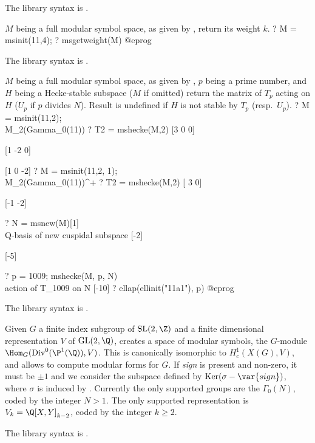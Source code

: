 The library syntax is .

\label{se:msgetweight}
$M$ being a full modular symbol space, as given by , return
its weight $k$.
\bprog
? M = msinit(11,4);
? msgetweight(M)
@eprog

The library syntax is .

\label{se:mshecke}
$M$ being a full modular symbol space, as given by ,
$p$ being a prime number, and $H$ being a Hecke-stable subspace ($M$ if
omitted) return the matrix of $T_p$ acting on $H$
($U_p$ if $p$ divides $N$). Result is undefined if $H$ is not stable
by $T_p$ (resp.~$U_p$).
\bprog
? M = msinit(11,2); \\ M_2(Gamma_0(11))
? T2 = mshecke(M,2)
[3  0  0]

[1 -2  0]

[1  0 -2]
? M = msinit(11,2, 1); \\ M_2(Gamma_0(11))^+
? T2 = mshecke(M,2)
[ 3  0]

[-1 -2]

? N = msnew(M)[1] \\ Q-basis of new cuspidal subspace
[-2]

[-5]

? p = 1009; mshecke(M, p, N) \\ action of T_1009 on N
[-10]
? ellap(ellinit("11a1"), p)
@eprog

The library syntax is .

\label{se:msinit}
Given $G$ a finite index subgroup of $\text{SL}(2,\Z)$
and a finite dimensional representation $V$ of $\text{GL}(2,\Q)$, creates a
space of modular symbols, the $G$-module $\Hom_G(\text{Div}^0(\P^1
(\Q)), V)$. This is canonically isomorphic to $H^1_c(X(G), V)$, and allows to
compute modular forms for $G$. If \emph{sign} is present and non-zero, it
must be $\pm1$ and we consider the subspace defined by $\text{Ker} (\sigma -
\var{sign})$, where $\sigma$ is induced by \kbd{[-1,0;0,1]}. Currently the
only supported groups are the $\Gamma_0(N)$, coded by the integer $N > 1$.
The only supported representation is $V_k = \Q[X,Y]_{k-2}$, coded by the
integer $k \geq 2$.

The library syntax is .

